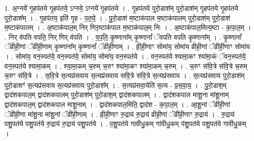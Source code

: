 \documentclass[17pt]{extarticle}
\begin{document}
1. अ॒ग्नये॑ गृ॒हप॑तये गृ॒हप॑तये॒ ऽग्नये॒ ऽग्नये॑ गृ॒हप॑तये । . गृ॒हप॑तये पुरो॒डाश॑म् पुरो॒डाश॑म् गृ॒हप॑तये गृ॒हप॑तये पुरो॒डाश᳚म् । . गृ॒हप॑तय॒ इति॑ गृ॒ह - प॒त॒ये॒ । . पु॒रो॒डाश॑ म॒ष्टाक॑पाल म॒ष्टाक॑पालम् पुरो॒डाश॑म् पुरो॒डाश॑ म॒ष्टाक॑पालम् । . अ॒ष्टाक॑पाल॒म् निर् णिर॒ष्टाक॑पाल म॒ष्टाक॑पाल॒म् निः । . अ॒ष्टाक॑पाल॒मित्य॒ष्टा - क॒पा॒ल॒म् । . निर् व॑पति वपति॒ निर् णिर् व॑पति । . व॒प॒ति॒ कृ॒ष्णाना᳚म् कृ॒ष्णानां᳚ ॅवपति वपति कृ॒ष्णाना᳚म् । . कृ॒ष्णानां᳚ ॅव्रीही॒णां ॅव्री॑ही॒णाम् कृ॒ष्णाना᳚म् कृ॒ष्णानां᳚ ॅव्रीही॒णाम् । . व्री॒ही॒णाꣳ सोमा॑य॒ सोमा॑य व्रीही॒णां ॅव्री॑ही॒णाꣳ सोमा॑य । . सोमा॑य॒ वन॒स्पत॑ये॒ वन॒स्पत॑ये॒ सोमा॑य॒ सोमा॑य॒ वन॒स्पत॑ये । . वन॒स्पत॑ये श्यामा॒कꣳ श्या॑मा॒कं ॅवन॒स्पत॑ये॒ वन॒स्पत॑ये श्यामा॒कम् । . श्या॒मा॒कम् च॒रुम् च॒रुꣳ श्या॑मा॒कꣳ श्या॑मा॒कम् च॒रुम् । . च॒रुꣳ स॑वि॒त्रे स॑वि॒त्रे च॒रुम् च॒रुꣳ स॑वि॒त्रे । . स॒वि॒त्रे स॒त्यप्र॑सवाय स॒त्यप्र॑सवाय सवि॒त्रे स॑वि॒त्रे स॒त्यप्र॑सवाय । . स॒त्यप्र॑सवाय पुरो॒डाश॑म् पुरो॒डाशꣳ॑ स॒त्यप्र॑सवाय स॒त्यप्र॑सवाय पुरो॒डाश᳚म् । . स॒त्यप्र॑सवा॒येति॑ स॒त्य - प्र॒स॒वा॒य॒ । . पु॒रो॒डाश॒म् द्वाद॑शकपाल॒म् द्वाद॑शकपालम् पुरो॒डाश॑म् पुरो॒डाश॒म् द्वाद॑शकपालम् । . द्वाद॑शकपाल माशू॒ना मा॑शू॒नाम् द्वाद॑शकपाल॒म् द्वाद॑शकपाल माशू॒नाम् । . द्वाद॑शकपाल॒मिति॒ द्वाद॑श - क॒पा॒ल॒म् । . आ॒शू॒नां ॅव्री॑ही॒णां ॅव्री॑ही॒णा मा॑शू॒ना मा॑शू॒नां ॅव्री॑ही॒णाम् । . व्री॒ही॒णाꣳ रु॒द्राय॑ रु॒द्राय॑ व्रीही॒णां ॅव्री॑ही॒णाꣳ रु॒द्राय॑ । . रु॒द्राय॑ पशु॒पत॑ये पशु॒पत॑ये रु॒द्राय॑ रु॒द्राय॑ पशु॒पत॑ये । . प॒शु॒पत॑ये गावीधु॒कम् गा॑वीधु॒कम् प॑शु॒पत॑ये पशु॒पत॑ये गावीधु॒कम् । \newline
\end{document}
